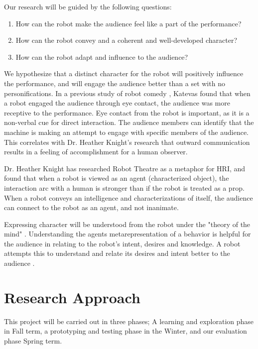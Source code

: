 \documentclass[onecolumn, draftclsnofoot,10pt, compsoc]{IEEEtran}
\begin{document}
Our research will be guided by the following questions:
\begin{enumerate}[\IEEEsetlabelwidth{6}]
\item How can the robot make the audience feel like a part of the performance?
\item How can the robot convey and a coherent and well-developed character?
\item How can the robot adapt and influence to the audience?
\end{enumerate}

We hypothesize that a distinct character for the robot will positively influence the performance, and will engage the audience better than a set with no personifications. In a previous study of robot comedy \cite{RobotComedyLab:2015}, Katevas found that when a robot engaged the audience through eye contact, the audience was more receptive to the performance. Eye contact from the robot is important, as it is a non-verbal cue for direct interaction. The audience members can identify that the machine is making an attempt to engage with specific members of the audience. This correlates with Dr. Heather Knight's \cite{KnightEightLessons:2011} research that outward communication results in a feeling of accomplishment for a human observer.

Dr. Heather Knight has researched Robot Theatre as a metaphor for HRI, and found that when a robot is viewed as an agent (characterized object), the interaction arc with a human is stronger than if the robot is treated as a prop. When a robot conveys an intelligence and characterizations of itself, the audience can connect to the robot as an agent, and not inanimate.

Expressing character will be understood from the robot under the "theory of the mind" \cite{leslie}. Understanding the agents metarepresentation of a behavior is helpful for the audience in relating to the robot's intent, desires and knowledge. A robot attempts this to understand and relate its desires and intent better to the audience \cite{theoryOfMindRobots}.

\section{Research Approach}
This project will be carried out in three phases; A learning and exploration phase in Fall term, a prototyping and testing phase in the Winter, and our evaluation phase Spring term.
\end{document}
